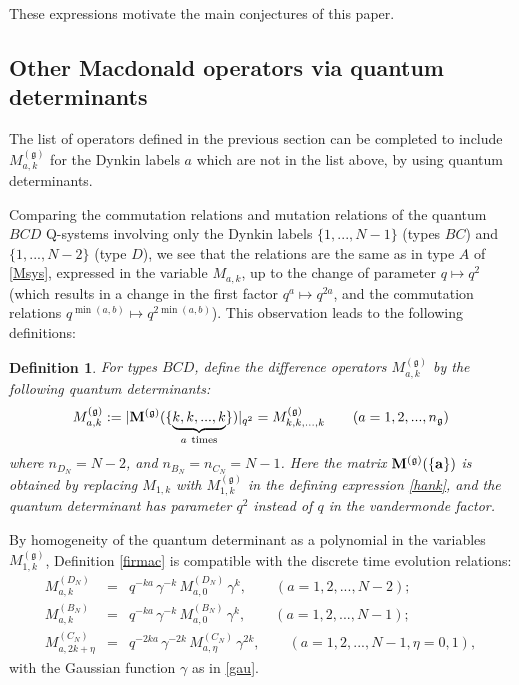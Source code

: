 \documentclass[12pt]{amsart}
\newtheorem{defn}[thm]{Definition}
\newcommand{\g}{{\mathfrak{g}}}
\newcommand{\ba}{{\mathbf a}}
\numberwithin{equation}{section}
\numberwithin{table}{section}
\begin{document}
These expressions motivate the main conjectures of this paper. 

\subsection{Other Macdonald operators via quantum determinants}

The list of operators defined in the previous section  can be completed to include $M_{a,k}^{(\g)}$ for the Dynkin labels $a$ which are not in the list above, by using quantum determinants.

Comparing the 
commutation relations and mutation relations of the quantum $BCD$ Q-systems involving only the Dynkin labels $\{1,...,N-1\}$ (types $BC$) and $\{1,...,N-2\}$ (type $D$), we see that the relations are the same
as in type $A$ of \eqref{Msys}, expressed in the variable $M_{a,k}$, up to the change
of parameter $q\mapsto q^2$ (which results in a change in the first factor $q^a \mapsto q^{2a}$, and the commutation relations $q^{\min(a,b)}
\mapsto q^{2{\min(a,b)}}$). This observation leads to the following definitions:

\begin{defn}
For types $BCD$, define the difference operators $M_{a,k}^{(\g)}$
by the following quantum determinants:
\begin{equation}\label{firmac}
M^{(\g)}_{a,k}:= |{\bf M}^{(\g)}(\{\underbrace{k,k,...,k}_{a\ \rm{times}}\})|_{q^2}=M_{k,k,...,k}^{(\g)} \qquad (a=1,2,...,n_{\g})
\end{equation}
where $n_{D_N}=N-2$, and $n_{B_N}=n_{C_N}=N-1$. Here the matrix ${\bf M}^{(\g)}(\{\ba \})$
is obtained by replacing $M_{1,k}$ with $M^{(\g)}_{1,k}$ in the defining expression \eqref{hank},
and the quantum determinant has parameter $q^2$ instead of $q$ in the vandermonde factor.
\end{defn}

By homogeneity of the quantum determinant as a polynomial in the variables $M^{(\g)}_{1,k}$,  Definition \eqref{firmac} is
compatible with the discrete time evolution relations:
\begin{eqnarray*}
M_{a,k}^{(D_N)}&=&q^{-k a}\, \gamma^{-k} \, M_{a,0}^{(D_N)} \, \gamma^k,\qquad (a=1,2,...,N-2);\\
M_{a,k}^{(B_N)}&=&q^{-k a}\, \gamma^{-k} \, M_{a,0}^{(B_N)} \, \gamma^k,\qquad (a=1,2,...,N-1);\\
M_{a,2k+\eta}^{(C_N)}&=&q^{-2k a}\, \gamma^{-2k} \, M_{a,\eta}^{(C_N)} \, \gamma^{2k},\qquad (a=1,2,...,N-1,\eta=0,1),
\end{eqnarray*}
with the Gaussian function $\gamma$ as in \eqref{gau}.
\end{document}
